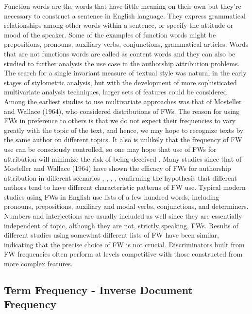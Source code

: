 Function words are the words that have little meaning on their own but they’re necessary to construct a sentence in English language. They express grammatical relationships among other words within a sentence, or specify the attitude or mood of the speaker. Some of the examples of function words might be prepositions, pronouns, auxiliary verbs, conjunctions, grammatical articles. Words that are not functions words are called as content words and they can also be studied to further analysis the use case in the authorship attribution problems. The search for a single invariant measure of textual style
was natural in the early stages of stylometric analysis, but with the development of more sophisticated multivariate analysis techniques, larger sets of features could be considered.
Among the earliest studies to use multivariate approaches was that of Mosteller and Wallace (1964), who considered distributions of FWs. The reason for using FWs in preference to others is that we do not expect their frequencies to
vary greatly with the topic of the text, and hence, we may hope to recognize texts by the same author on different topics. It also is unlikely that the frequency of FW use can be
consciously controlled, so one may hope that use of FWs for attribution will minimize the risk of being deceived \cite{chung2007psychological}.
Many studies since that of Mosteller and Wallace (1964) have shown the efficacy of FWs for authorship attribution in different scenarios \cite{argamon2005measuring}, \cite{baayen2002experiment}, 
\cite{koppel2005determining},
\cite{zhao2005effective}, confirming the hypothesis that different authors tend to have different characteristic patterns of FW use.
Typical modern studies using FWs in English use lists of a few hundred words, including pronouns, prepositions, auxiliary and modal verbs, conjunctions, and determiners.
Numbers and interjections are usually included as well since they are essentially independent of topic, although they are not, strictly speaking, FWs. Results of different studies using
somewhat different lists of FW have been similar, indicating that the precise choice of FW is not crucial. Discriminators built from FW frequencies often perform at levels competitive with those constructed from more complex features.

\subsection{Term Frequency - Inverse Document Frequency}

